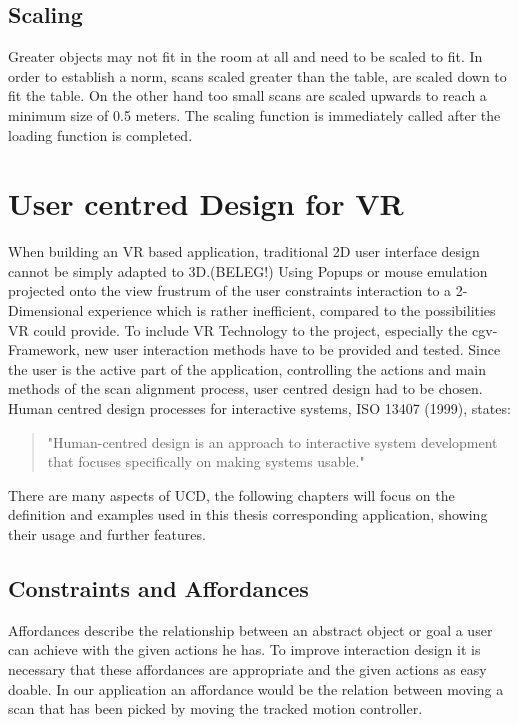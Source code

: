 \documentclass[hyperref,english,bachelorofscience,bibnum]{cgvpub}
\begin{document}
\subsection{Scaling}

Greater objects may not fit in the room at all and need to be scaled to fit. In order to establish a norm, scans scaled greater than the table, are scaled down to fit the table. On the other hand too small scans are scaled upwards to reach a minimum size of 0.5 meters. The scaling function is immediately called after the loading function is completed.

\section{User centred Design for VR}

When building an VR based application, traditional 2D user interface design cannot be simply adapted to 3D.(BELEG!)
Using Popups or mouse emulation projected onto the view frustrum of the user constraints interaction to a 2-Dimensional experience which is rather inefficient, compared to the possibilities VR could provide.
To include VR Technology to the project, especially the cgv-Framework, new user interaction methods have to be provided and tested. Since the user is the active part of the application, controlling the actions and main methods of the scan alignment process, user centred design had to be chosen. 
Human centred design processes for interactive systems, ISO 13407 (1999), states: 
\begin{quote}
"Human-centred design is an approach to interactive system development that focuses specifically on making systems usable."
\end{quote}
There are many aspects of UCD, the following chapters will focus on the definition and examples used in this thesis corresponding application, showing their usage and further features.

\subsection{Constraints and Affordances}

Affordances describe the relationship between an abstract object or goal a user can achieve with the given actions he has\cite{Jerald2015}.
To improve interaction design it is necessary that these affordances are appropriate and the given actions as easy doable\cite{Jerald2015}.
In our application an affordance would be the relation between moving a scan that has been picked by moving the tracked motion controller. 
\end{document}
